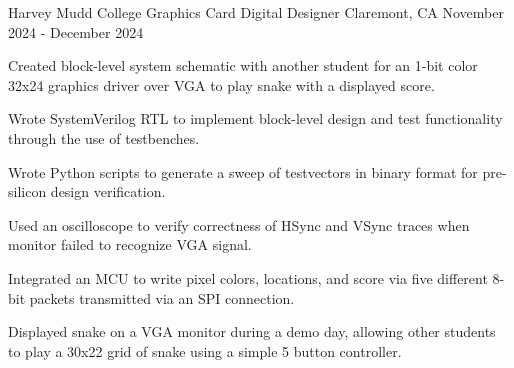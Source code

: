   \begin{cventry}
    {Harvey Mudd College} %
    {Graphics Card Digital Designer} %
    {Claremont, CA} %
    {November 2024 - December 2024} %
    {
      \begin{cvitems} %
        \item {
        Created block-level system schematic with another student for an 1-bit color 32x24 graphics driver over VGA to play snake with a displayed score.
        }
        \item {
        Wrote SystemVerilog RTL to implement block-level design and test functionality through the use of testbenches.
        }
        \item {
        Wrote Python scripts to generate a sweep of testvectors in binary format for pre-silicon design verification.
        }
        \item {
        Used an oscilloscope to verify correctness of HSync and VSync traces when monitor failed to recognize VGA signal.
        }
        \item {
        Integrated an MCU to write pixel colors, locations, and score via five different 8-bit packets transmitted via an SPI connection.
        }
        \item {
        Displayed snake on a VGA monitor during a demo day, allowing other students to play a 30x22 grid of snake using a simple 5 button controller.
        }
      \end{cvitems}
    }
  \end{cventry}
